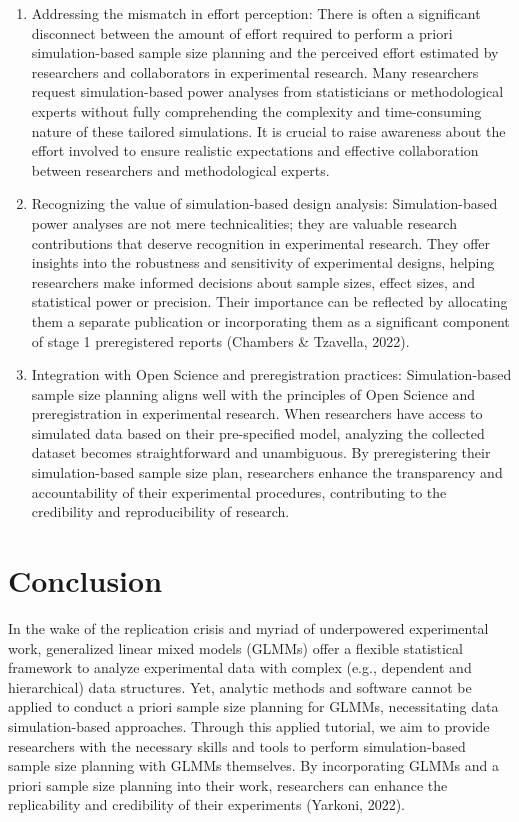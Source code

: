 \documentclass[
  man,floatsintext]{apa6}
\begin{document}
\begin{enumerate}
\item
  Addressing the mismatch in effort perception: There is often a significant disconnect between the amount of effort required to perform a priori simulation-based sample size planning and the perceived effort estimated by researchers and collaborators in experimental research. Many researchers request simulation-based power analyses from statisticians or methodological experts without fully comprehending the complexity and time-consuming nature of these tailored simulations. It is crucial to raise awareness about the effort involved to ensure realistic expectations and effective collaboration between researchers and methodological experts.
\item
  Recognizing the value of simulation-based design analysis: Simulation-based power analyses are not mere technicalities; they are valuable research contributions that deserve recognition in experimental research. They offer insights into the robustness and sensitivity of experimental designs, helping researchers make informed decisions about sample sizes, effect sizes, and statistical power or precision. Their importance can be reflected by allocating them a separate publication or incorporating them as a significant component of stage 1 preregistered reports (Chambers \& Tzavella, 2022).
\item
  Integration with Open Science and preregistration practices: Simulation-based sample size planning aligns well with the principles of Open Science and preregistration in experimental research. When researchers have access to simulated data based on their pre-specified model, analyzing the collected dataset becomes straightforward and unambiguous. By preregistering their simulation-based sample size plan, researchers enhance the transparency and accountability of their experimental procedures, contributing to the credibility and reproducibility of research.
\end{enumerate}

\hypertarget{conclusion}{%
\section{Conclusion}\label{conclusion}}

In the wake of the replication crisis and myriad of underpowered experimental work, generalized linear mixed models (GLMMs) offer a flexible statistical framework to analyze experimental data with complex (e.g., dependent and hierarchical) data structures. Yet, analytic methods and software cannot be applied to conduct a priori sample size planning for GLMMs, necessitating data simulation-based approaches. Through this applied tutorial, we aim to provide researchers with the necessary skills and tools to perform simulation-based sample size planning with GLMMs themselves. By incorporating GLMMs and a priori sample size planning into their work, researchers can enhance the replicability and credibility of their experiments (Yarkoni, 2022).
\end{document}
